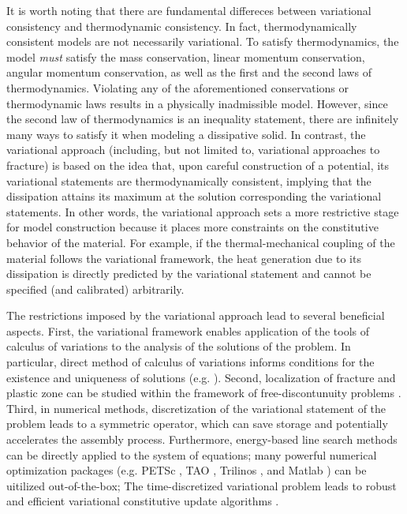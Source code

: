It is worth noting that there are fundamental differeces between variational consistency and thermodynamic consistency. In fact, thermodynamically consistent models are not necessarily variational. To satisfy thermodynamics, the model \emph{must} satisfy the mass conservation, linear momentum conservation, angular momentum conservation, as well as the first and the second laws of thermodynamics. Violating any of the aforementioned conservations or thermodynamic laws results in a physically inadmissible model. However, since the second law of thermodynamics is an inequality statement, there are infinitely many ways to satisfy it when modeling a dissipative solid. In contrast, the variational approach (including, but not limited to, variational approaches to fracture) is based on the idea that, upon careful construction of a potential, its variational statements are thermodynamically consistent, implying that the dissipation attains its maximum at the solution corresponding the variational statements. In other words, the variational approach sets a more restrictive stage for model construction because it places more constraints on the constitutive behavior of the material. For example, if the thermal-mechanical coupling of the material follows the variational framework, the heat generation due to its dissipation is directly predicted by the variational statement and cannot be specified (and calibrated) arbitrarily.

The restrictions imposed by the variational approach lead to several beneficial aspects. First, the variational framework enables application of the tools of calculus of variations to the analysis of the solutions of the problem. In particular, direct method of calculus of variations informs conditions for the existence and uniqueness of solutions (e.g. \cite{dal2012introduction}). Second, localization of fracture and plastic zone can be studied within the framework of free-discontunuity problems \cite{braides1998approximation,gariepy2001functions}. Third, in numerical methods, discretization of the variational statement of the problem leads to a symmetric operator, which can save storage and potentially accelerates the assembly process. Furthermore, energy-based line search methods can be directly applied to the system of equations; many powerful numerical optimization packages (e.g. PETSc \cite{petsc-web-page}, TAO \cite{benson2003tao}, Trilinos \cite{heroux2005overview}, and Matlab \cite{higham2016matlab}) can be uitilized out-of-the-box; The time-discretized variational problem leads to robust and efficient variational constitutive update algorithms \cite{ortiz_1999}.
